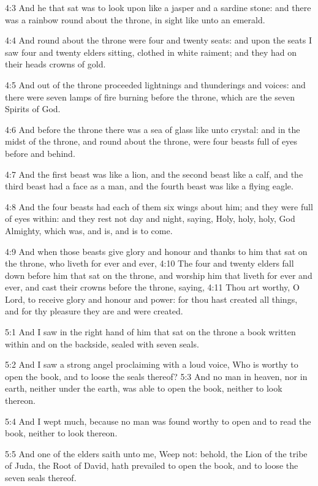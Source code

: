 4:3 And he that sat was to look upon like a jasper and a sardine
stone: and there was a rainbow round about the throne, in sight like
unto an emerald.

4:4 And round about the throne were four and twenty seats: and upon
the seats I saw four and twenty elders sitting, clothed in white
raiment; and they had on their heads crowns of gold.

4:5 And out of the throne proceeded lightnings and thunderings and
voices: and there were seven lamps of fire burning before the throne,
which are the seven Spirits of God.

4:6 And before the throne there was a sea of glass like unto crystal:
and in the midst of the throne, and round about the throne, were four
beasts full of eyes before and behind.

4:7 And the first beast was like a lion, and the second beast like a
calf, and the third beast had a face as a man, and the fourth beast
was like a flying eagle.

4:8 And the four beasts had each of them six wings about him; and they
were full of eyes within: and they rest not day and night, saying,
Holy, holy, holy, \LORD God Almighty, which was, and is, and is to
come.

4:9 And when those beasts give glory and honour and thanks to him that
sat on the throne, who liveth for ever and ever, 4:10 The four and
twenty elders fall down before him that sat on the throne, and worship
him that liveth for ever and ever, and cast their crowns before the
throne, saying, 4:11 Thou art worthy, O Lord, to receive glory and
honour and power: for thou hast created all things, and for thy
pleasure they are and were created.

5:1 And I saw in the right hand of him that sat on the throne a book
written within and on the backside, sealed with seven seals.

5:2 And I saw a strong angel proclaiming with a loud voice, Who is
worthy to open the book, and to loose the seals thereof?  5:3 And no
man in heaven, nor in earth, neither under the earth, was able to open
the book, neither to look thereon.

5:4 And I wept much, because no man was found worthy to open and to
read the book, neither to look thereon.

5:5 And one of the elders saith unto me, Weep not: behold, the Lion of
the tribe of Juda, the Root of David, hath prevailed to open the book,
and to loose the seven seals thereof.

